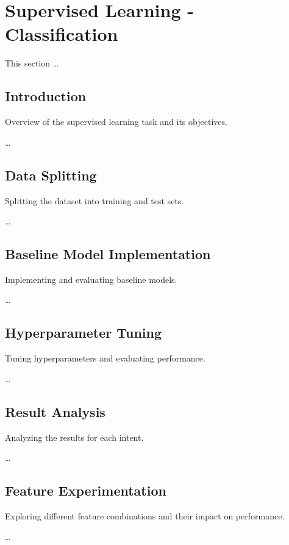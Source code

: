 

\section{Supervised Learning - Classification}

    This section \ldots

    \subsection{Introduction}
    
        Overview of the supervised learning task and its objectives.

        \ldots

    \subsection{Data Splitting}
    
        Splitting the dataset into training and test sets.

        \ldots
        
    \subsection{Baseline Model Implementation}
    
        Implementing and evaluating baseline models.

        \ldots
        
    \subsection{Hyperparameter Tuning}
    
        Tuning hyperparameters and evaluating performance.

        \ldots
        
    \subsection{Result Analysis}
    
        Analyzing the results for each intent.

        \ldots
        
    \subsection{Feature Experimentation}
    
        Exploring different feature combinations and their impact on performance.

        \ldots
